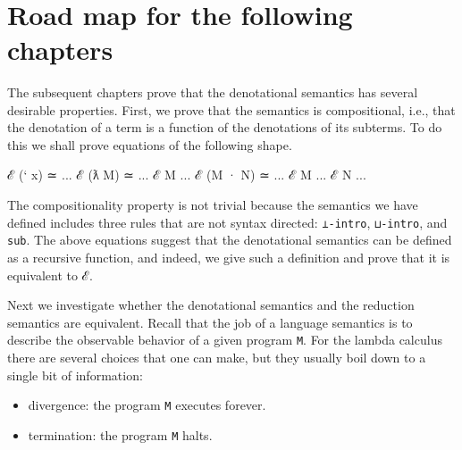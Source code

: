 \begin{fence}
\begin{code}
%
\>[2]%
\>[1299I]\AgdaSymbol{:}\AgdaSpace{}%
\AgdaSpace{}%
\AgdaSymbol{(}\AgdaSpace{}%
\AgdaSymbol{:}\AgdaSpace{}%
\AgdaSpace{}%
\AgdaSymbol{)}\<%
\\
\>[1299I][@{}l@{\AgdaIndent{0}}]%
\>[6]\AgdaComment{-----}\<%
\\
\>[2][@{}l@{\AgdaIndent{0}}]%
\>[4]\AgdaSpace{}%
\AgdaSpace{}%
\AgdaSpace{}%
\<%
\\
%
\>[2]\AgdaSymbol{(}\AgdaSpace{}%
\AgdaSymbol{)}%
\>[9]\AgdaSymbol{=}%
\>[12]\<%
\end{code}
\end{fence}

\hypertarget{road-map-for-the-following-chapters}{%
\section{Road map for the following
chapters}\label{road-map-for-the-following-chapters}}

The subsequent chapters prove that the denotational semantics has
several desirable properties. First, we prove that the semantics is
compositional, i.e., that the denotation of a term is a function of the
denotations of its subterms. To do this we shall prove equations of the
following shape.

\begin{myDisplay}
ℰ (` x) ≃ ...
ℰ (ƛ M) ≃ ... ℰ M ...
ℰ (M · N) ≃ ... ℰ M ... ℰ N ...
\end{myDisplay}

The compositionality property is not trivial because the semantics we
have defined includes three rules that are not syntax directed:
\texttt{⊥-intro}, \texttt{⊔-intro}, and \texttt{sub}. The above
equations suggest that the denotational semantics can be defined as a
recursive function, and indeed, we give such a definition and prove that
it is equivalent to ℰ.

Next we investigate whether the denotational semantics and the reduction
semantics are equivalent. Recall that the job of a language semantics is
to describe the observable behavior of a given program \texttt{M}. For
the lambda calculus there are several choices that one can make, but
they usually boil down to a single bit of information:

\begin{itemize}
\tightlist
\item
  divergence: the program \texttt{M} executes forever.
\item
  termination: the program \texttt{M} halts.
\end{itemize}

